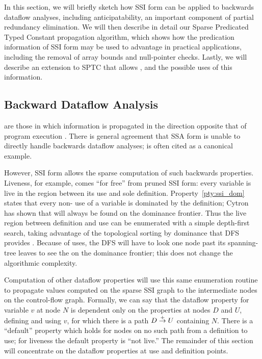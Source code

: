\documentclass[12pt,titlepage,twoside]{article}
\begin{document}
In this section, we will briefly sketch how SSI form can be applied to
backwards dataflow analyses, including anticipatability, an important
component of partial redundancy elimination.  We will then describe in
detail our Sparse Predicated Typed Constant propagation algorithm,
which shows how the predication information of SSI form may be used to
advantage in practical applications, including the removal of array
bounds and null-pointer checks.  Lastly, we will describe an extension
to SPTC that allows , and the possible uses
of this information.

\subsection{Backward Dataflow Analysis}\label{sec:bidirectional}
 are those in which information is
propagated in the direction opposite that of program execution
\cite{offner95}.  There is general agreement
\cite{johnson93:dfg,ferrante91:pruned,weise94:vdg}
that SSA form is unable to directly handle backwards dataflow
analyses;  is often cited as a canonical example.

However, SSI form allows the sparse computation of such backwards
properties.  Liveness, for example, comes ``for free'' from pruned SSI
form: every variable is live in the region between its use and
sole definition.  Property~\ref{pty:ssi_dom} states that every
non-\phifunction{} use of a variable is dominated by the definition;
Cytron \cite{cytron91:ssa} has shown that  will always be
found on the dominance frontier.  Thus the live region between
definition and use can be enumerated with a simple depth-first search,
taking advantage of the topological sorting by dominance that DFS
provides \cite{offner95}.  Because of \phifunction{} uses, the DFS
will have to look one node past its spanning-tree leaves to see the
 on the dominance frontier; this does not change the
algorithmic complexity.

Computation of other dataflow properties will use this same
enumeration routine to propagate values computed on the sparse SSI
graph to the intermediate nodes on the control-flow graph.  Formally,
we can say that the dataflow property for variable $v$ at node $N$ is
dependent only on the properties at nodes $D$ and $U$, defining and
using $v$, for which there is a path $D\stackrel{+}{\rightarrow} U$ containing $N$.
There is a ``default'' property which holds for nodes on no such path
from a definition to use; for liveness the default property is ``not
live.''  The remainder of this section will concentrate on the
dataflow properties at use and definition points.
\end{document}

